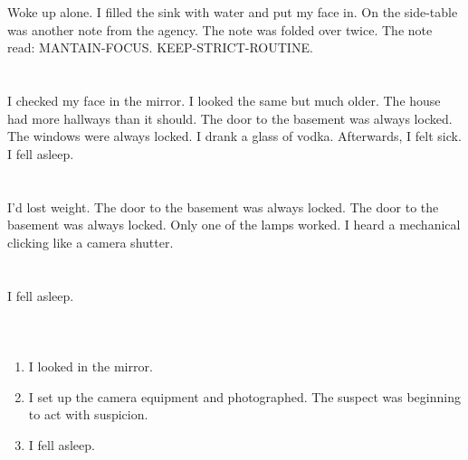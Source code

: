 \documentclass{article}
\begin{document}
    \section{}
    Woke up alone. I filled the sink with water and put my face in. On the side-table was another note from the agency. The note was folded over twice. The note read: MANTAIN-FOCUS. KEEP-STRICT-ROUTINE.  
    \newpage
    
    \section{}
    I checked my face in the mirror. I looked the same but much older. The house had more hallways than it should. The door to the basement was always locked. The windows were always locked. I drank a glass of vodka. Afterwards, I felt sick. I fell asleep.  
    \newpage
    
    \section{}
    I'd lost weight. The door to the basement was always locked. The door to the basement was always locked. Only one of the lamps worked. I heard a mechanical clicking like a camera shutter.  
    \newpage
    
    \section{}
    I fell asleep.\\\\ 
    \newpage
    
    \section{}
    
    \begin{enumerate}
    
    \item I looked in the mirror.\\
    
    \item I set up the camera equipment and photographed. The suspect was beginning to act with suspicion.\\
    
    \item I fell asleep.\\
    
    \end{enumerate}
     
\end{document}
